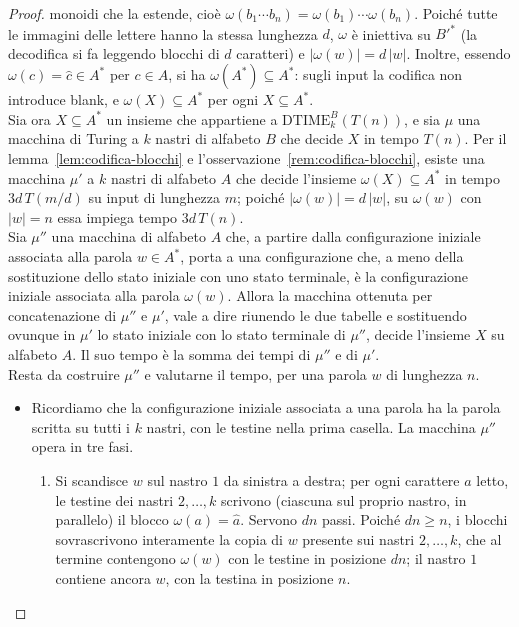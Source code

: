 \begin{lemm}
\begin{proof}
monoidi che la estende, cioè $\omega(b_1\cdots b_n)=\omega(b_1)\cdots\omega(b_n)$.
Poiché tutte le immagini delle lettere hanno la stessa lunghezza $d$, $\omega$ è
iniettiva su $B'^{*}$ (la decodifica si fa leggendo blocchi di $d$ caratteri) e
$|\omega(w)|=d\,|w|$. Inoltre, essendo $\omega(c)=\hat c\in A^{*}$ per $c\in A$,
si ha $\omega(A^{*})\subseteq A^{*}$: sugli input la codifica non introduce blank,
e $\omega(X)\subseteq A^{*}$ per ogni $X\subseteq A^{*}$.
\\
Sia ora $X \subseteq A^*$ un insieme che appartiene a $\mathrm{DTIME}^B_k(T(n))$, e sia
$\mu$ una macchina di Turing a $k$ nastri di alfabeto $B$ che decide $X$ in tempo
$T(n)$. Per il lemma~\ref{lem:codifica-blocchi} e l'osservazione~\ref{rem:codifica-blocchi}, esiste una macchina $\mu'$ a $k$
nastri di alfabeto $A$ che decide l'insieme $\omega(X)\subseteq A^*$ in tempo
$3d\,T(m/d)$ su input di lunghezza $m$; poiché $|\omega(w)| = d\,|w|$, su $\omega(w)$
con $|w| = n$ essa impiega tempo $3d\,T(n)$.
\\
Sia $\mu''$ una macchina di alfabeto $A$ che, a partire dalla configurazione iniziale
associata alla parola $w \in A^*$, porta a una configurazione che, a meno della
sostituzione dello stato iniziale con uno stato terminale, è la configurazione
iniziale associata alla parola $\omega(w)$. Allora la macchina ottenuta per
concatenazione di $\mu''$ e $\mu'$, vale a dire riunendo le due tabelle e sostituendo
ovunque in $\mu'$ lo stato iniziale con lo stato terminale di $\mu''$, decide
l'insieme $X$ su alfabeto $A$. Il suo tempo è la somma dei tempi di $\mu''$ e di $\mu'$.
\\
Resta da costruire $\mu''$ e valutarne il tempo, per una parola $w$ di lunghezza $n$.
\begin{itemize}
    \item[Caso $k \geq 2$:] Ricordiamo che la configurazione iniziale associata a una
parola ha la parola scritta su tutti i $k$ nastri, con le testine nella prima casella.
La macchina $\mu''$ opera in tre fasi.
\begin{enumerate}
  \item Si scandisce $w$ sul nastro $1$ da sinistra a destra; per ogni carattere $a$
  letto, le testine dei nastri $2,\dots,k$ scrivono (ciascuna sul proprio nastro, in
  parallelo) il blocco $\omega(a)=\hat a$. Servono $dn$ passi. Poiché $dn \geq n$, i
  blocchi sovrascrivono interamente la copia di $w$ presente sui nastri $2,\dots,k$,
  che al termine contengono $\omega(w)$ con le testine in posizione $dn$; il nastro
  $1$ contiene ancora $w$, con la testina in posizione $n$.

\end{enumerate}
\end{itemize}
\end{proof}
\end{lemm}
